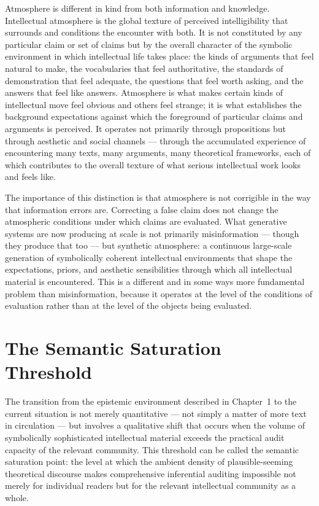 \documentclass[12pt, openright, twoside]{book}
\begin{document}
Atmosphere is different in kind from both information and knowledge.
Intellectual atmosphere is the global texture of perceived intelligibility
that surrounds and conditions the encounter with both. It is not
constituted by any particular claim or set of claims but by the overall
character of the symbolic environment in which intellectual life takes
place: the kinds of arguments that feel natural to make, the vocabularies
that feel authoritative, the standards of demonstration that feel
adequate, the questions that feel worth asking, and the answers that
feel like answers. Atmosphere is what makes certain kinds of intellectual
move feel obvious and others feel strange; it is what establishes the
background expectations against which the foreground of particular
claims and arguments is perceived. It operates not primarily through
propositions but through aesthetic and social channels --- through the
accumulated experience of encountering many texts, many arguments,
many theoretical frameworks, each of which contributes to the overall
texture of what serious intellectual work looks and feels like.

The importance of this distinction is that atmosphere is not corrigible
in the way that information errors are. Correcting a false claim does
not change the atmospheric conditions under which claims are evaluated.
What generative systems are now producing at scale is not primarily
misinformation --- though they produce that too --- but synthetic
atmosphere: a continuous large-scale generation of symbolically coherent
intellectual environments that shape the expectations, priors, and
aesthetic sensibilities through which all intellectual material is
encountered. This is a different and in some ways more fundamental
problem than misinformation, because it operates at the level of
the conditions of evaluation rather than at the level of the objects
being evaluated.

\section{The Semantic Saturation Threshold}

The transition from the epistemic environment described in Chapter~1
to the current situation is not merely quantitative --- not simply
a matter of more text in circulation --- but involves a qualitative
shift that occurs when the volume of symbolically sophisticated
intellectual material exceeds the practical audit capacity of the
relevant community. This threshold can be called the semantic saturation
point: the level at which the ambient density of plausible-seeming
theoretical discourse makes comprehensive inferential auditing
impossible not merely for individual readers but for the relevant
intellectual community as a whole.
\end{document}
